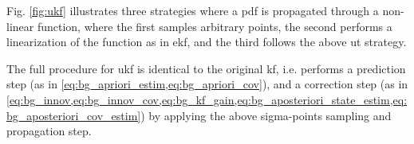 Fig. \ref{fig:ukf} illustrates three strategies where a \gls{pdf} is propagated through a non-linear function, where the first samples arbitrary points, the second performs a linearization of the function as in \gls{ekf}, and the third follows the above \gls{ut} strategy.

The full procedure for \gls{ukf} is identical to the original \gls{kf}, i.e. performs
a prediction step (as in \cref{eq:bg_apriori_estim,eq:bg_apriori_cov}), and
a correction step (as in \cref{eq:bg_innov,eq:bg_innov_cov,eq:bg_kf_gain,eq:bg_aposteriori_state_estim,eq:bg_aposteriori_cov_estim}) by applying the above sigma-points sampling and propagation step.

